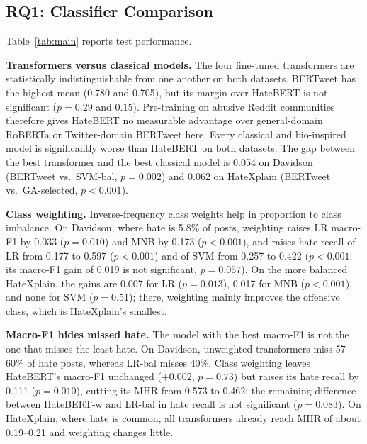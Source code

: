 \documentclass[lettersize,journal]{IEEEtran}
\begin{document}
\subsection{RQ1: Classifier Comparison}\label{sec:rq1}
Table~\ref{tab:main} reports test performance.

\begin{table}[t]
\centering
\caption{Test Performance, Mean $\pm$ Standard Deviation of Macro-F1 Over Five Stratified Splits (Other Columns Are Means). MHR = Missed-Hate Rate ($1-$Hate Recall) With No Human Review. ECE After Temperature Scaling. Bold: Best Macro-F1 and Lowest MHR per Dataset Among Fine-Tuned Models (the LLM's Low MHR Comes From Flagging a Large Share of All Posts as Hate). $^{\dagger}$: Not Significantly Different From HateBERT (Holm-Adjusted Corrected $t$-Test, $p\ge0.05$); All Unmarked Models Are Significantly Worse.}
\label{tab:main}
\small
\setlength{\tabcolsep}{4pt}

\end{table}

\textbf{Transformers versus classical models.} The four fine-tuned transformers are statistically indistinguishable from one another on both datasets. BERTweet has the highest mean (0.780 and 0.705), but its margin over HateBERT is not significant ($p=0.29$ and $0.15$). Pre-training on abusive Reddit communities therefore gives HateBERT no measurable advantage over general-domain RoBERTa or Twitter-domain BERTweet here. Every classical and bio-inspired model is significantly worse than HateBERT on both datasets. The gap between the best transformer and the best classical model is 0.054 on Davidson (BERTweet vs.\ SVM-bal, $p=0.002$) and 0.062 on HateXplain (BERTweet vs.\ GA-selected, $p<0.001$).

\textbf{Class weighting.} Inverse-frequency class weights help in proportion to class imbalance. On Davidson, where hate is 5.8\% of posts, weighting raises LR macro-F1 by 0.033 ($p=0.010$) and MNB by 0.173 ($p<0.001$), and raises hate recall of LR from 0.177 to 0.597 ($p<0.001$) and of SVM from 0.257 to 0.422 ($p<0.001$; its macro-F1 gain of 0.019 is not significant, $p=0.057$). On the more balanced HateXplain, the gains are 0.007 for LR ($p=0.013$), 0.017 for MNB ($p<0.001$), and none for SVM ($p=0.51$); there, weighting mainly improves the offensive class, which is HateXplain's smallest.

\textbf{Macro-F1 hides missed hate.} The model with the best macro-F1 is not the one that misses the least hate. On Davidson, unweighted transformers miss 57--60\% of hate posts, whereas LR-bal misses 40\%. Class weighting leaves HateBERT's macro-F1 unchanged ($+0.002$, $p=0.73$) but raises its hate recall by 0.111 ($p=0.010$), cutting its MHR from 0.573 to 0.462; the remaining difference between HateBERT-w and LR-bal in hate recall is not significant ($p=0.083$). On HateXplain, where hate is common, all transformers already reach MHR of about 0.19--0.21 and weighting changes little.
\end{document}
